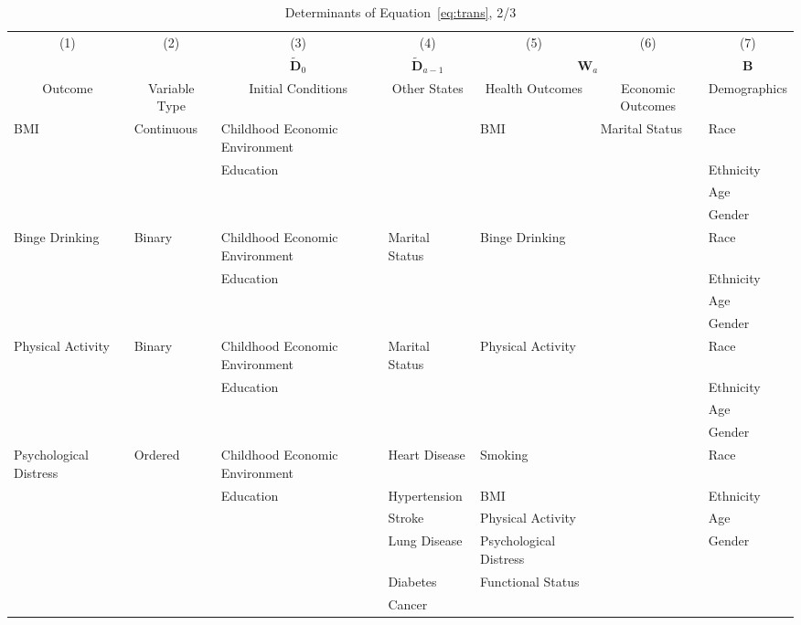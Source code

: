 \begin{table}
\caption{Determinants of Equation~\eqref{eq:trans}, 2/3} \label{table:supertab2}
\begin{scriptsize}
\begin{tabular}{lllllll}
\toprule 
\multicolumn{1}{c}{(1)} & \multicolumn{1}{c}{(2)} & \multicolumn{1}{c}{(3)} & \multicolumn{1}{c}{(4)} & \multicolumn{1}{c}{(5)} & \multicolumn{1}{c}{(6)} & \multicolumn{1}{c}{(7)} \\
 & &  \multicolumn{1}{c}{$\tilde{\bm{D}}_0$} &  \multicolumn{1}{c}{$\tilde{\bm{D}}_{a-1}$} & \multicolumn{2}{c}{ $\bm{W}_a$ } &  \multicolumn{1}{c}{$\bm{B}$} \\ 
\multicolumn{1}{c}{Outcome} & \multicolumn{1}{c}{Variable Type} & \multicolumn{1}{c}{Initial Conditions} & \multicolumn{1}{c}{Other States} & \multicolumn{1}{c}{Health Outcomes} & \multicolumn{1}{c}{Economic Outcomes} & \multicolumn{1}{c}{Demographics} \\
\midrule
BMI & Continuous & Childhood Economic Environment & & BMI & Marital Status & Race \\
& & Education & & & & Ethnicity \\
 & &  & & & & Age \\
 &  & & & & & Gender \\
\midrule
Binge Drinking & Binary & Childhood Economic Environment &  Marital Status & Binge Drinking & & Race \\
 & & Education &  &  & & Ethnicity \\
  & &  &  &  & & Age \\
  &  & &  &  & & Gender \\
\midrule
Physical Activity & Binary & Childhood Economic Environment & Marital Status & Physical Activity & & Race \\
 & & Education &  & & & Ethnicity \\
  & &  &  &  & & Age \\
  &  & &  &  & & Gender \\
\midrule
Psychological Distress & Ordered & Childhood Economic Environment & Heart Disease & Smoking & & Race \\
 & & Education & Hypertension & BMI & & Ethnicity \\
 &  &  & Stroke & Physical Activity & & Age \\
   & & & Lung Disease & Psychological Distress & & Gender \\
    & & & Diabetes & Functional Status & & \\
     & & & Cancer & & & \\

\end{tabular}
\end{scriptsize}
\end{table}
